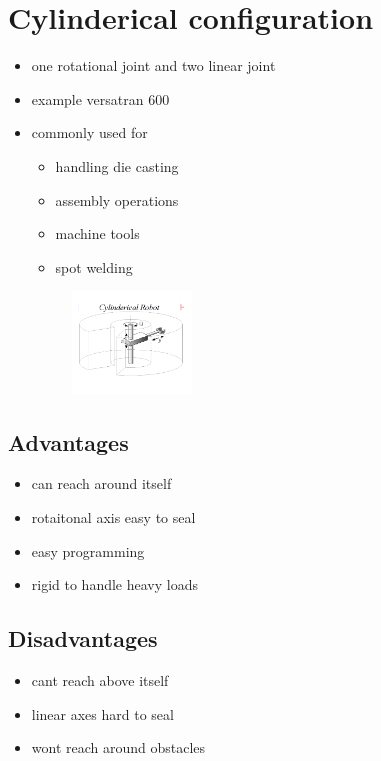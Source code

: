 \documentclass{article}
\begin{document}
\section{Cylinderical configuration}
\begin{itemize}
	\item one rotational joint and two linear joint
	\item example versatran 600
	\item commonly used for
	      \begin{itemize}
		      \item handling die casting
		      \item assembly operations
		      \item machine tools
		      \item spot welding
	      \end{itemize}
	      \begin{figure}[htpb]
		      \centering
		      \includegraphics[width=0.3\textwidth]{CylindericalConfiguration.png}
		      \caption{}
		      \label{fig:}
	      \end{figure}
\end{itemize}
\subsection{Advantages}
\begin{itemize}
	\item can reach around itself
	\item rotaitonal axis easy to seal
	\item easy programming
	\item rigid to handle heavy loads
\end{itemize}
\subsection{Disadvantages}
\begin{itemize}
	\item cant reach above itself
	\item linear axes hard to seal
	\item wont reach around obstacles
\end{itemize}
\end{document}
